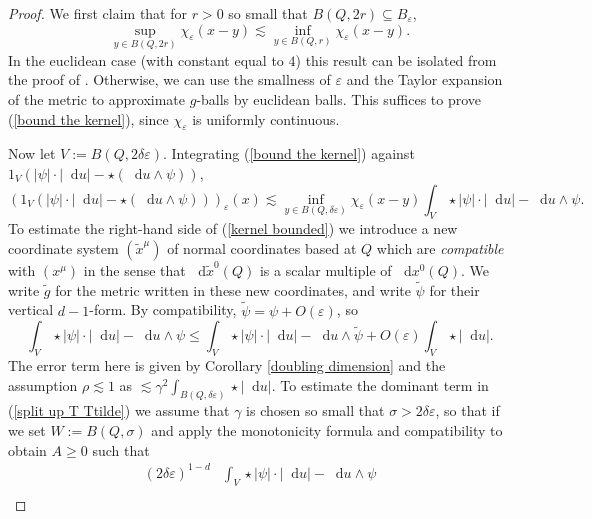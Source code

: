 \documentclass[reqno,10pt]{amsart}
\newcommand*\dif{\mathop{}\!\mathrm{d}}
\newcommand{\dfn}[1]{\emph{#1}\index{#1}}
\theoremstyle{definition}
\numberwithin{equation}{section}
\begin{document}
\begin{proof}
We first claim that for $r > 0$ so small that $B(Q, 2r) \subseteq B_\varepsilon$,
\begin{equation}\label{bound the kernel}
\sup_{y \in B(Q, 2r)} \chi_\varepsilon(x - y) \lesssim \inf_{y \in B(Q, r)} \chi_\varepsilon(x - y).
\end{equation}
In the euclidean case (with constant equal to $4$) this result can be isolated from the proof of \cite[Theorem 7.3]{Giusti77}.
Otherwise, we can use the smallness of $\varepsilon$ and the Taylor expansion of the metric to approximate $g$-balls by euclidean balls.
This suffices to prove (\ref{bound the kernel}), since $\chi_\varepsilon$ is uniformly continuous.

Now let $V := B(Q, 2\delta\varepsilon)$.
Integrating (\ref{bound the kernel}) against $1_V(|\psi| \cdot |\dif u| - \star(\dif u \wedge \psi))$,
\begin{equation}\label{kernel bounded}
(1_V(|\psi| \cdot |\dif u| - \star(\dif u \wedge \psi)))_\varepsilon(x) \lesssim \inf_{y \in B(Q, \delta\varepsilon)} \chi_\varepsilon(x - y) \int_V \star |\psi| \cdot |\dif u| - \dif u \wedge \psi.
\end{equation}
To estimate the right-hand side of (\ref{kernel bounded}) we introduce a new coordinate system $(\tilde x^\mu)$ of normal coordinates based at $Q$ which are \dfn{compatible} with $(x^\mu)$ in the sense that $\dif \tilde x^0(Q)$ is a scalar multiple of $\dif x^0(Q)$.
We write $\tilde g$ for the metric written in these new coordinates, and write $\tilde \psi$ for their vertical $d-1$-form.
By compatibility, $\tilde \psi = \psi + O(\varepsilon)$, so
\begin{equation}\label{split up T Ttilde}
\int_V \star |\psi| \cdot |\dif u| - \dif u \wedge \psi \leq \int_V \star |\psi| \cdot |\dif u| - \dif u \wedge \tilde \psi + O(\varepsilon) \int_V \star |\dif u|.
\end{equation}
The error term here is given by Corollary \ref{doubling dimension} and the assumption $\rho \lesssim 1$ as $\lesssim \gamma^2 \int_{B(Q, \delta\varepsilon)} \star |\dif u|$.
To estimate the dominant term in (\ref{split up T Ttilde}) we assume that $\gamma$ is chosen so small that $\sigma > 2\delta\varepsilon$, so that if we set $W := B(Q, \sigma)$ and apply the monotonicity formula and compatibility to obtain $A \geq 0$ such that
\begin{align*}
(2\delta\varepsilon)^{1 - d} &\int_V \star |\psi| \cdot |\dif u| - \dif u \wedge \psi \\

\end{align*}
\end{proof}
\end{document}
